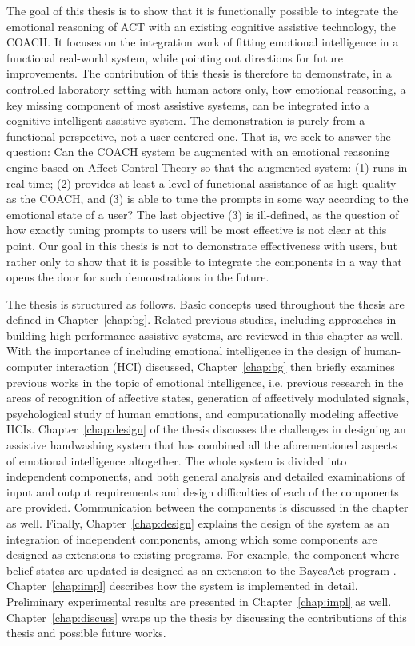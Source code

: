 The goal of this thesis is to show that it is functionally possible to integrate the emotional reasoning of ACT with an existing cognitive assistive technology, the COACH.  It focuses on the integration work of fitting emotional intelligence in a functional real-world system, while pointing out directions for future improvements. The contribution of this thesis is therefore to demonstrate, in a controlled laboratory setting with human actors only, how emotional reasoning, a key missing component of most assistive systems, can be integrated into a cognitive intelligent assistive system.  The demonstration is purely from a functional perspective, not a user-centered one. That is, we seek to answer the question: Can the COACH system be augmented with an emotional reasoning engine based on Affect Control Theory so that the augmented system: (1) runs in real-time;  (2) provides at least a level of functional assistance of as high quality as the COACH, and (3) is able to tune the prompts in some way according to the emotional state of a user? The last objective (3) is ill-defined, as the question of how exactly tuning prompts to users will be most effective is not clear at this point.  Our goal in this thesis is not to demonstrate effectiveness with users, but rather only to show that it is possible to integrate the components in a way that opens the door for such demonstrations in the future.

The thesis is structured as follows. Basic concepts used throughout the thesis are defined in Chapter~\ref{chap:bg}. Related previous studies, including approaches in building high performance assistive systems, are reviewed in this chapter as well. With the importance of including emotional intelligence in the design of human-computer interaction (HCI) discussed, Chapter~\ref{chap:bg} then briefly examines previous works in the topic of emotional intelligence, i.e. previous research in the areas of recognition of affective states, generation of affectively modulated signals, psychological study of human emotions, and computationally modeling affective HCIs. Chapter~\ref{chap:design} of the thesis discusses the challenges in designing an assistive handwashing system that has combined all the aforementioned aspects of emotional intelligence altogether. The whole system is divided into independent components, and both general analysis and detailed examinations of input and output requirements and design difficulties of each of the components are provided. Communication between the components is discussed in the chapter as well. Finally, Chapter~\ref{chap:design} explains the design of the system as an integration of independent components, among which some components are designed as extensions to existing programs. For example, the component where belief states are updated is designed as an extension to the BayesAct program \cite{hoey2013bayesian}. Chapter~\ref{chap:impl} describes how the system is implemented in detail. Preliminary experimental results are presented in Chapter~\ref{chap:impl} as well. Chapter~\ref{chap:discuss} wraps up the thesis by discussing the contributions of this thesis and possible future works.
